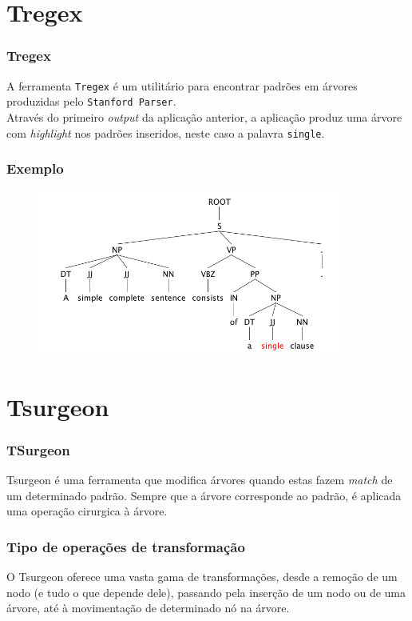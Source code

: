 \documentclass{beamer}
\begin{document}
\section{Tregex}
\begin{frame}\frametitle{Tregex}
 A ferramenta \texttt{Tregex} é um utilitário para encontrar padrões em árvores produzidas pelo \texttt{Stanford Parser}.\\

 Através do primeiro \emph{output} da aplicação anterior, a aplicação produz uma árvore com \emph{highlight} nos padrões inseridos, neste caso a palavra \texttt{single}.  
\end{frame}

\begin{frame}\frametitle{Exemplo}
\begin{figure}[htbp]
\begin{center}
\includegraphics[width=0.9\textwidth]{images/scr.png}
\end{center}
\end{figure}

\end{frame}

\section{Tsurgeon}
\begin{frame}\frametitle{TSurgeon}
Tsurgeon é uma ferramenta que modifica árvores quando estas fazem \textit{match} de um determinado padrão. Sempre que a árvore corresponde ao padrão, é aplicada uma operação cirurgica à árvore.
\end{frame}

\begin{frame}\frametitle{Tipo de operações de transformação}
O Tsurgeon oferece uma vasta gama de transformações, desde a remoção de um nodo (e tudo o que depende dele), passando pela inserção de um nodo ou de uma árvore, até à movimentação de determinado nó na árvore.
\end{frame}
\end{document}
